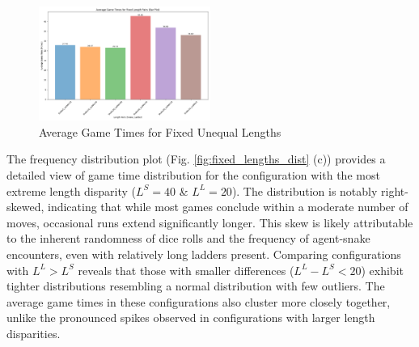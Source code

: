 \begin{figure}[th]
	\centering
	\includegraphics[width=0.5\textwidth]{"../Chapter 2/withLength/UnequalLengths/approach_1_fixed_length_pairs_barplot"}
	\caption{Average Game Times for Fixed Unequal Lengths}
	\label{fig:approach1fixedlengthpairsbarplot}
\end{figure}

The frequency distribution plot (Fig. \ref{fig:fixed_lengths_dist} (c)) provides a detailed view of game time distribution for the configuration with the most extreme length disparity ($L^S = 40$ \& $L^L = 20$). The distribution is notably right-skewed, indicating that while most games conclude within a moderate number of moves, occasional runs extend significantly longer. This skew is likely attributable to the inherent randomness of dice rolls and the frequency of agent-snake encounters, even with relatively long ladders present. Comparing configurations with $L^L > L^S$ reveals that those with smaller differences ($L^L - L^S < 20$) exhibit tighter distributions resembling a normal distribution with few outliers. The average game times in these configurations also cluster more closely together, unlike the pronounced spikes observed in configurations with larger length disparities.

